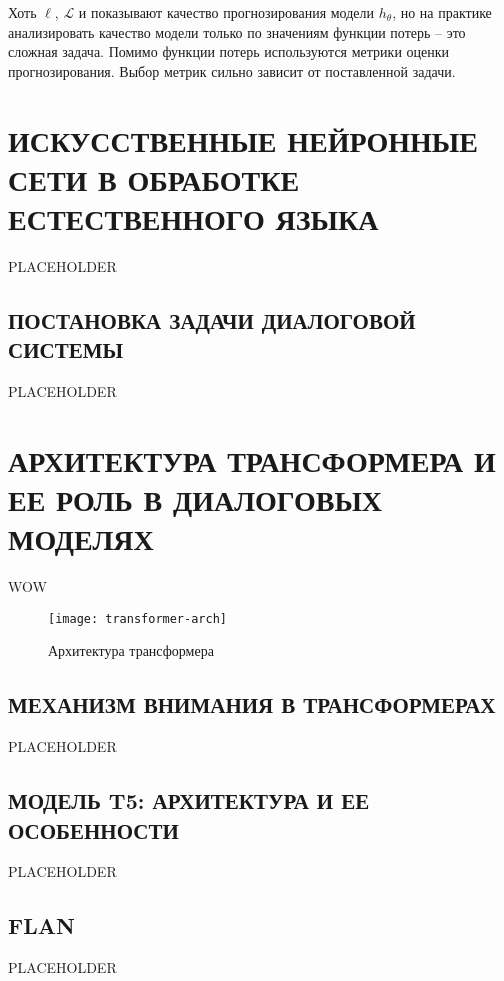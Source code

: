 Хоть $\ell$, $\mathcal{L}$ и показывают качество прогнозирования модели $h_{\theta}$, но на практике анализировать качество модели только по значениям функции потерь -- это сложная задача. Помимо функции потерь используются метрики оценки прогнозирования. Выбор метрик сильно зависит от поставленной задачи.

\section{ИСКУССТВЕННЫЕ НЕЙРОННЫЕ СЕТИ В ОБРАБОТКЕ ЕСТЕСТВЕННОГО ЯЗЫКА}
PLACEHOLDER

\subsection{ПОСТАНОВКА ЗАДАЧИ ДИАЛОГОВОЙ СИСТЕМЫ}
PLACEHOLDER

\section{АРХИТЕКТУРА ТРАНСФОРМЕРА И ЕЕ РОЛЬ В ДИАЛОГОВЫХ МОДЕЛЯХ}
WOW

\begin{figure}[H]
    \centering
    \texttt{[image: transformer-arch]}
    \caption{Архитектура трансформера}
    \label{fig:transformer-arch}
\end{figure}


\subsection{МЕХАНИЗМ ВНИМАНИЯ В ТРАНСФОРМЕРАХ}
PLACEHOLDER

\subsection{МОДЕЛЬ T5: АРХИТЕКТУРА И ЕЕ ОСОБЕННОСТИ}
PLACEHOLDER

\subsection{FLAN}
PLACEHOLDER
